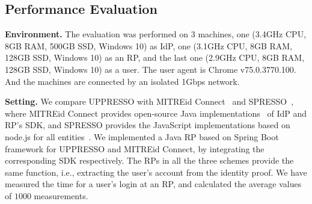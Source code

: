 \subsection{Performance Evaluation}
\label{sec:evaluation}
\noindent\textbf{Environment.} The evaluation was performed on 3 machines,
one (3.4GHz CPU, 8GB RAM, 500GB SSD, Windows 10) as IdP,
one (3.1GHz CPU, 8GB RAM, 128GB SSD, Windows 10) as an RP,
and the last one (2.9GHz CPU, 8GB RAM, 128GB SSD, Windows 10) as a user.
The user agent is Chrome v75.0.3770.100.
And the machines are connected by an isolated 1Gbps network.



\noindent\textbf{Setting.}
We compare UPPRESSO with MITREid Connect~\cite{MITREid} and SPRESSO~\cite{SPRESSO},
 where MITREid Connect provides open-source Java implementations~\cite{MITREid} of IdP and RP's SDK,
  and SPRESSO provides the JavaScript implementations based on node.js for all entities~\cite{SPRESSO}.
We implemented a Java RP based on Spring Boot framework for UPPRESSO and MITREid Connect, by integrating the corresponding SDK respectively.
The RPs in all the three schemes provide the same function, i.e.,   extracting the user's account from the identity proof.
We have measured the time for a user's login at an RP, and calculated the average values of $1000$ measurements.


